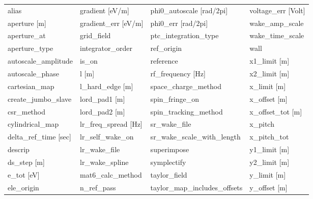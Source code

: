  \begin{tabular}{llll} \toprule
alias                          & gradient [eV/m]                & phi0_autoscale [rad/2pi]       & voltage_err [Volt]             \\
aperture [m]                   & gradient_err [eV/m]            & phi0_err [rad/2pi]             & wake_amp_scale                 \\
aperture_at                    & grid_field                     & ptc_integration_type           & wake_time_scale                \\
aperture_type                  & integrator_order               & ref_origin                     & wall                           \\
autoscale_amplitude            & is_on                          & reference                      & x1_limit [m]                   \\
autoscale_phase                & l [m]                          & rf_frequency [Hz]              & x2_limit [m]                   \\
cartesian_map                  & l_hard_edge [m]                & space_charge_method            & x_limit [m]                    \\
create_jumbo_slave             & lord_pad1 [m]                  & spin_fringe_on                 & x_offset [m]                   \\
csr_method                     & lord_pad2 [m]                  & spin_tracking_method           & x_offset_tot [m]               \\
cylindrical_map                & lr_freq_spread [Hz]            & sr_wake_file                   & x_pitch                        \\
delta_ref_time [sec]           & lr_self_wake_on                & sr_wake_scale_with_length      & x_pitch_tot                    \\
descrip                        & lr_wake_file                   & superimpose                    & y1_limit [m]                   \\
ds_step [m]                    & lr_wake_spline                 & symplectify                    & y2_limit [m]                   \\
e_tot [eV]                     & mat6_calc_method               & taylor_field                   & y_limit [m]                    \\
ele_origin                     & n_ref_pass                     & taylor_map_includes_offsets    & y_offset [m]                   \\

\end{tabular}
